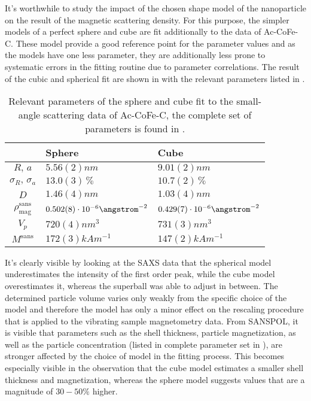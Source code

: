 \documentclass[\main/dresen_thesis.tex]{subfiles}
\begin{document}

    It's worthwhile to study the impact of the chosen shape model of the nanoparticle on the result of the magnetic scattering density.
    For this purpose, the simpler models of a perfect sphere and cube are fit additionally to the data of Ac-CoFe-C.
    These model provide a good reference point for the parameter values and as the models have one less parameter, they are additionally less prone to systematic errors in the fitting routine due to parameter correlations.
    The result of the cubic and spherical fit are shown in  with the relevant parameters listed in .

    \begin{table}[ht]
      \centering
      \caption{\label{tab:monolayers:nanoparticle:sasSphereCubeFit}Relevant parameters of the sphere and cube fit to the small-angle scattering data of Ac-CoFe-C, the complete set of parameters is found in .}
      \begin{tabular}{ c | l | l }
          & Sphere & Cube \\
        \hline
        $R, \, a$
          & $5.56(2) \unit{nm}$
          & $9.01(2) \unit{nm}$\\
        $\sigma_R, \, \sigma_a$
          & $13.0(3) \,\%$
          & $10.7(2) \,\%$\\
        $D$
          & $1.46(4) \unit{nm}$
          & $1.03(4) \unit{nm}$\\
        $\rho_\mathrm{mag}^\mathrm{sans}$
          & $0.502(8) \cdot 10^{-6} \angstrom^{-2}$
          & $0.429(7) \cdot 10^{-6} \angstrom^{-2}$\\
        \hline
        $V_p$
          & $720(4) \unit{nm^{3}}$
          & $731(3) \unit{nm^{3}}$\\
        $M^\mathrm{sans}$
          & $172(3) \unit{kAm^{-1}}$
          & $147(2) \unit{kAm^{-1}}$\\
        \hline
      \end{tabular}
    \end{table}

    It's clearly visible by looking at the SAXS data that the spherical model underestimates the intensity of the first order peak, while the cube model overestimates it, whereas the superball was able to adjust in between.
    The determined particle volume varies only weakly from the specific choice of the model and therefore the model has only a minor effect on the rescaling procedure that is applied to the vibrating sample magnetometry data.
    From SANSPOL, it is visible that parameters such as the shell thickness, particle magnetization, as well as the particle concentration (listed in complete parameter set in ), are stronger affected by the choice of model in the fitting process.
    This becomes especially visible in the observation that the cube model estimates a smaller shell thickness and magnetization, whereas the sphere model suggests values that are a magnitude of $30 - 50 \unit{\%}$ higher.
\end{document}

